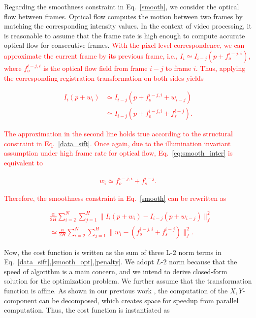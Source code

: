 \documentclass[10pt,journal]{IEEEtran}
\newcommand{\Songfan}[1]{\textcolor{red}{#1}}
\begin{document}
Regarding the smoothness constraint in Eq.~\ref{smooth}, we consider the optical flow between frames. Optical flow computes the motion between two frames by matching the corresponding intensity values. In the context of video processing, it is reasonable to assume that the frame rate is high enough to compute accurate optical flow for consecutive frames. \Songfan{With the pixel-level correspondence, we can approximate the current frame by its previous frame, i.e., $I_i\simeq I_{i-j}(p+f_o^{i-j,i})$, where $f_o^{i-j,i}$ is the optical flow field from frame $i-j$ to frame $i$. Thus, applying the corresponding registration transformation on both sides yields }

\Songfan{
\begin{align}
\label{eq:smooth_inter}
I_i(p+w_i)& \simeq I_{i-j}(p+f_o^{i-j,i}+w_{i-j}) \nonumber \\
					& \simeq I_{i-j}(p+f_o^{i-j,i}+f_s^{i-j}).
\end{align}
}

\Songfan{The approximation in the second line holds true according to the structural constraint in Eq.~\ref{data_sift}. Once again, due to the illumination invariant assumption under high frame rate for optical flow, Eq.~\ref{eq:smooth_inter} is equivalent to}

\Songfan{
\begin{align}
w_i \simeq f_o^{i-j,i}+f_s^{i-j}.	\nonumber
\end{align}
}

\Songfan{Therefore, the smoothness constraint in Eq.~\ref{smooth} can be rewritten as }

\Songfan{
\begin{align}
\label{smooth_opt}
&\frac{\alpha}{2H}\sum_{i=2}^{N}\sum_{j=1}^{H}\parallel{I_i(p+w_i)-I_{i-j}(p+w_{i-j})}\parallel_f^2 \nonumber \\
&\simeq\frac{\alpha}{2H}\sum_{i=2}^{N}\sum_{j=1}^{H}\parallel{w_i-(f_o^{i-j,i}+f_s^{i-j})}\parallel_f^2.
\end{align}
}

Now, the cost function is written as the sum of three L-2 norm terms in Eq.~\ref{data_sift},\ref{smooth_opt},\ref{penalty}. We adopt $L$-2 norm because that the speed of algorithm is a main concern, and we intend to derive closed-form solution for the optimization problem. We further assume that the transformation function is affine. As shown in our previous work \cite{Yang_FG13}, the computation of the $X,Y$-component can be decomposed, which creates space for speedup from parallel computation. Thus, the cost function is instantiated as
\end{document}
